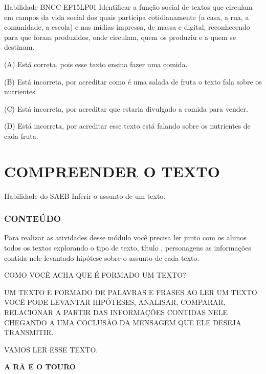 \begin{escola}
Habilidade BNCC EF15LP01 Identificar a função social de textos que
circulam em campos da vida social dos quais participa cotidianamente (a
casa, a rua, a comunidade, a escola) e nas mídias impressa, de massa e
digital, reconhecendo para que foram produzidos, onde circulam, quem os
produziu e a quem se destinam.

\protect\hypertarget{_heading=h.2xcytpi}{}{}(A) Está correta, pois esse
texto ensina fazer uma comida.

(B) Está incorreta, por acreditar como é uma salada de fruta o texto
fala sobre os nutrientes.

(C) Está incorreta, por acreditar que estaria divulgado a comida para
vender.

(D) Está incorreta, por acreditar esse texto está falando sobre os
nutrientes de cada fruta.

\chapter{COMPREENDER O TEXTO}

\protect\hypertarget{_heading=h.3whwml4}{}{}Habilidade do SAEB
Inferir o assunto de um texto.

\subsection{CONTEÚDO}\label{conteuxfado-4}

Para realizar as atividades desse módulo você precisa ler junto com os
alunos todos os textos explorando o tipo de texto, título , personagens
as informações contida nele levantado hipótese sobre o assunto de cada
texto.

COMO VOCÊ ACHA QUE É FORMADO UM TEXTO?

UM TEXTO E FORMADO DE PALAVRAS E FRASES AO LER UM TEXTO VOCÊ PODE
LEVANTAR HIPÓTESES, ANALISAR, COMPARAR, RELACIONAR A PARTIR DAS
INFORMAÇÕES CONTIDAS NELE CHEGANDO A UMA COCLUSÃO DA MENSAGEM QUE ELE
DESEJA TRANSMITIR.

VAMOS LER ESSE TEXTO.

\textbf{A RÃ E O TOURO}


\end{escola}
